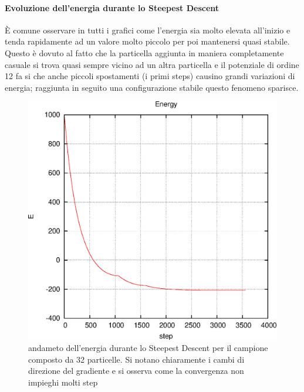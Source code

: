 \documentclass[a4paper,11pt]{article}
\begin{document}
		\paragraph{Evoluzione dell'energia durante lo Steepest Descent\\} %
		\label{par:evoluzione_dell_energia_durante_lo_steepest_descent}
			\`E comune osservare in tutti i grafici come l'energia sia molto
			elevata all'inizio e tenda rapidamente ad un valore molto piccolo per
			poi mantenersi quasi stabile.\\
			Questo è dovuto al fatto che la particella aggiunta in maniera 
			completamente casuale si trova quasi sempre vicino ad un altra 
			particella e il potenziale di ordine 12 fa si che anche piccoli
			spostamenti (i primi steps) causino grandi variazioni di energia;
			raggiunta in seguito una configurazione stabile questo 
			fenomeno sparisce.\\
			\begin{figure}[H]
					\centering
					\includegraphics[scale = 0.7]{E_SD_32.eps}
					\caption{andameto dell'energia durante lo Steepest Descent per il campione composto da 32 particelle. Si notano chiaramente i cambi di direzione del gradiente e si osserva come la convergenza non impieghi molti step}
					\label{fig:SD_32}
			\end{figure}
\end{document}
